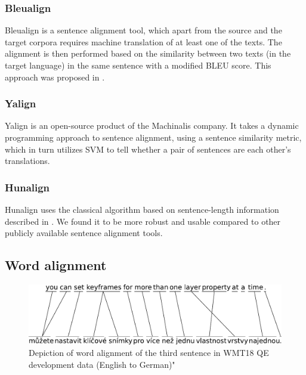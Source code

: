 

\subsubsection{Bleualign}
Bleualign is a sentence alignment tool, which apart from the source and the target corpora requires machine translation of at least one of the texts. The alignment is then performed based on the similarity between two texts (in the target language) in the same sentence with a modified BLEU score. This approach was proposed in \cite{sennrich_bleualign:2011}.

\pagebreak
\subsubsection{Yalign}
Yalign is an open-source product of the Machinalis company. It takes a dynamic programming approach to sentence alignment, using a sentence similarity metric, which in turn utilizes SVM to tell whether a pair of sentences are each other's translations.

\subsubsection{Hunalign}
Hunalign uses the classical algorithm based on sentence-length information described in \cite{gale_church:1993}. We found it to be more robust and usable compared to other publicly available sentence alignment tools.


\subsection{Word alignment}

\begin{figure}[ht]
  \centering
  \includegraphics[width=\textwidth]{img/alignment/word_alignment_1_pdfa1a.pdf}
  \caption{\label{fig:word_alignment_1} Depiction of word alignment of the third sentence in WMT18 QE development data (English to German)"}
\end{figure}

